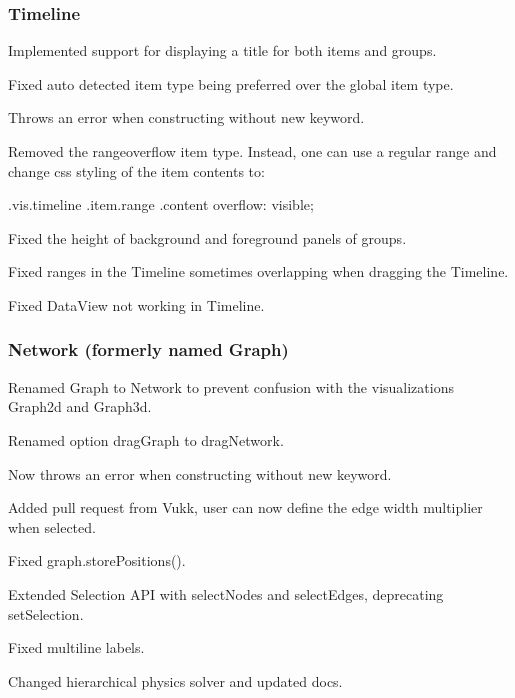 \subsubsection*{Timeline}


\begin{DoxyItemize}
\item Implemented support for displaying a {\ttfamily title} for both items and groups.
\item Fixed auto detected item type being preferred over the global item {\ttfamily type}.
\item Throws an error when constructing without new keyword.
\item Removed the \textquotesingle{}rangeoverflow\textquotesingle{} item type. Instead, one can use a regular range and change css styling of the item contents to\+: \begin{DoxyVerb}  .vis.timeline .item.range .content {
    overflow: visible;
  }
\end{DoxyVerb}

\item Fixed the height of background and foreground panels of groups.
\item Fixed ranges in the Timeline sometimes overlapping when dragging the Timeline.
\item Fixed {\ttfamily Data\+View} not working in Timeline.
\end{DoxyItemize}

\subsubsection*{Network (formerly named Graph)}


\begin{DoxyItemize}
\item Renamed {\ttfamily Graph} to {\ttfamily Network} to prevent confusion with the visualizations {\ttfamily Graph2d} and {\ttfamily Graph3d}.
\begin{DoxyItemize}
\item Renamed option {\ttfamily drag\+Graph} to {\ttfamily drag\+Network}.
\end{DoxyItemize}
\item Now throws an error when constructing without new keyword.
\item Added pull request from Vukk, user can now define the edge width multiplier when selected.
\item Fixed {\ttfamily graph.\+store\+Positions()}.
\item Extended Selection A\+PI with {\ttfamily select\+Nodes} and {\ttfamily select\+Edges}, deprecating {\ttfamily set\+Selection}.
\item Fixed multiline labels.
\item Changed hierarchical physics solver and updated docs.
\end{DoxyItemize}

